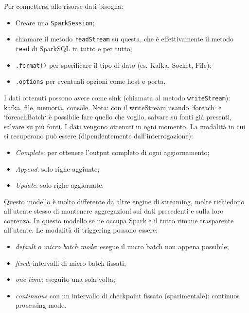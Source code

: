 \documentclass[12pt,italian]{article}
\begin{document}
Per connettersi alle risorse dati bisogna:
\begin{itemize}
	\item Creare una \texttt{SparkSession};
	\item chiamare il metodo \texttt{readStream} su questa, che è effettivamente il metodo \texttt{read} di SparkSQL in tutto e per tutto;
	\item \texttt{.format()} per specificare il tipo di dato (es. Kafka, Socket, File);
	\item \texttt{.options} per eventuali opzioni come host e porta.
\end{itemize}

I dati ottenuti possono avere come sink (chiamata al metodo \texttt{writeStream}): kafka, file, memoria, console.
Nota: con il writeStream usando `foreach` e `foreachBatch` è possibile fare quello che voglio, salvare su fonti già presenti, salvare su più fonti.
\newline 
I dati vengono ottenuti in ogni momento.
La modalità in cui si recuperano può essere (dipendentemente dall'interrogazione): 
\begin{itemize}
	\item \textit{Complete}: per ottenere l'output completo di ogni aggiornamento;
	\item \textit{Append}: solo righe aggiunte;
	\item \textit{Update}: solo righe aggiornate.
\end{itemize}

Questo modello è molto differente da altre engine di streaming, molte richiedono all'utente stesso di mantenere aggregazioni sui dati precedenti e sulla loro coerenza.
In questo modello se ne occupa Spark e il tutto rimane trasparente all'utente.
Le modalità di triggering possono essere:
\begin{itemize}
	\item \textit{default o micro batch mode}: esegue il micro batch non appena possibile;
	\item \textit{fixed}: intervalli di micro batch fissati;
	\item \textit{one time}: eseguito una sola volta;
	\item \textit{continuous} con un intervallo di checkpoint fissato (sparimentale): continuos processing mode.
\end{itemize}
\end{document}
